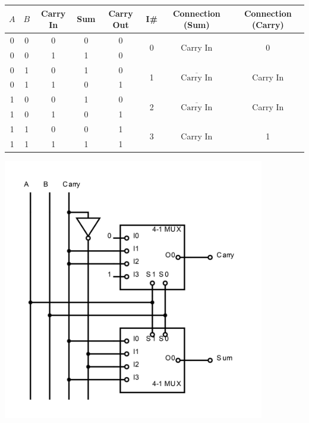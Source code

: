 \documentclass[12pt]{book}
\newenvironment{indented} {
	\begin{list}{}{\setlength{\leftmargin}{5mm}}
	\item[]
}{\end{list}}
\begin{document}
    \begin{indented}
        \begin{tabular}{c|c|c||c|c||c|c|c}
            $A$ & $B$ & Carry In & Sum & Carry Out & I\# & Connection (Sum) & Connection (Carry)\\
            \hline
            0 & 0 & 0 & 0 & 0 & \multirow{2}{*}{0} & \multirow{2}{*}{Carry In} & \multirow{2}{*}{0} \\
            0 & 0 & 1 & 1 & 0 & & & \\
            \hline
            0 & 1 & 0 & 1 & 0 & \multirow{2}{*}{1} & \multirow{2}{*}{$\overline{\text{Carry In}}$} & \multirow{2}{*}{Carry In} \\
            0 & 1 & 1 & 0 & 1 & & & \\
            \hline
            1 & 0 & 0 & 1 & 0 & \multirow{2}{*}{2} & \multirow{2}{*}{$\overline{\text{Carry In}}$} & \multirow{2}{*}{Carry In} \\
            1 & 0 & 1 & 0 & 1 & & & \\
            \hline
            1 & 1 & 0 & 0 & 1 & \multirow{2}{*}{3} & \multirow{2}{*}{Carry In} & \multirow{2}{*}{1} \\
            1 & 1 & 1 & 1 & 1 & & & \\        
        \end{tabular}
    \end{indented}

    \includegraphics[height=4.5in]{q6_muxadder}
\end{document}
